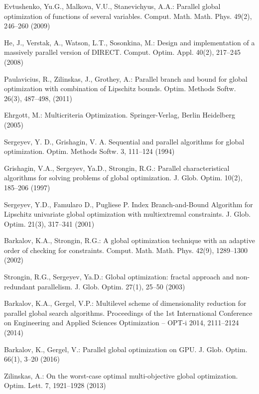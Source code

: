 \documentclass[smallcondensed]{svjour3}     %
\begin{document}
\begin{thebibliography}{}
Evtushenko, Yu.G., Malkova, V.U., Stanevichyus, A.A.: Parallel global optimization of functions of several variables. Comput. Math. Math. Phys. 49(2), 246--260 (2009)

He, J., Verstak, A., Watson, L.T., Sosonkina, M.: Design and implementation of a massively parallel version of DIRECT. Comput. Optim. Appl. 40(2), 217--245 (2008)

Paulavicius, R., Zilinskas, J., Grothey, A.: Parallel branch and bound for global optimization with combination of Lipschitz bounds. Optim. Methods Softw. 26(3), 487--498, (2011)

Ehrgott, M.: Multicriteria Optimization. Springer-Verlag, Berlin Heidelberg (2005)

Sergeyev, Y. D., Grishagin, V. A. Sequential and parallel algorithms for global optimization. Optim. Methods Softw. 3, 111--124 (1994)

Grishagin, V.A., Sergeyev, Ya.D., Strongin, R.G.: Parallel characteristical algorithms for solving problems of global optimization. J. Glob. Optim. 10(2), 185--206 (1997)

Sergeyev, Y.D., Famularo D., Pugliese P. Index Branch-and-Bound Algorithm for Lipschitz univariate global optimization with multiextremal constraints. J. Glob. Optim. 21(3), 317--341 (2001) 

Barkalov, K.A., Strongin, R.G.: A global optimization technique with an adaptive order of checking for constraints. Comput. Math. Math. Phys. 42(9), 1289--1300 (2002)

Strongin, R.G., Sergeyev, Ya.D.: Global optimization: fractal approach and non-redundant parallelism. J. Glob. Optim. 27(1), 25--50 (2003)

Barkalov, K.A., Gergel, V.P.: Multilevel scheme of dimensionality reduction for parallel global search algorithms. Proceedings of the 1st International Conference on Engineering and Applied Sciences Optimization -- OPT-i 2014, 2111--2124 (2014)

Barkalov, K., Gergel, V.: Parallel global optimization on GPU. J. Glob. Optim. 66(1), 3--20 (2016)

Zilinskas, A.: On the worst-case optimal multi-objective global optimization. Optim. Lett. 7, 1921--1928 (2013)


\end{thebibliography}
\end{document}
